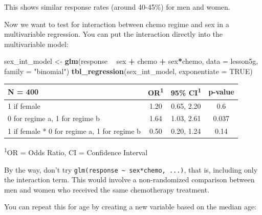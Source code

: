 \documentclass[]{book}
\newenvironment{Shaded}{\begin{snugshade}}{\end{snugshade}}
\newcommand{\CommentTok}[1]{\textcolor[rgb]{0.56,0.35,0.01}{\textit{#1}}}
\newcommand{\DataTypeTok}[1]{\textcolor[rgb]{0.13,0.29,0.53}{#1}}
\newcommand{\KeywordTok}[1]{\textcolor[rgb]{0.13,0.29,0.53}{\textbf{#1}}}
\newcommand{\NormalTok}[1]{#1}
\newcommand{\OperatorTok}[1]{\textcolor[rgb]{0.81,0.36,0.00}{\textbf{#1}}}
\newcommand{\OtherTok}[1]{\textcolor[rgb]{0.56,0.35,0.01}{#1}}
\newcommand{\StringTok}[1]{\textcolor[rgb]{0.31,0.60,0.02}{#1}}
\begin{document}
This shows similar response rates (around 40-45\%) for men and women.

Now we want to test for interaction between chemo regime and sex in a multivariable regression. You can put the interaction directly into the multivariable model:

\begin{Shaded}
\begin{Highlighting}[]
\NormalTok{sex_int_model <-}\StringTok{ }\KeywordTok{glm}\NormalTok{(response }\OperatorTok{~}\StringTok{ }\NormalTok{sex }\OperatorTok{+}\StringTok{ }\NormalTok{chemo }\OperatorTok{+}\StringTok{ }\NormalTok{sex}\OperatorTok{*}\NormalTok{chemo,}
                     \DataTypeTok{data =}\NormalTok{ lesson5g,}
                     \DataTypeTok{family =} \StringTok{"binomial"}\NormalTok{)}
\KeywordTok{tbl_regression}\NormalTok{(sex_int_model, }\DataTypeTok{exponentiate =} \OtherTok{TRUE}\NormalTok{)}
\end{Highlighting}
\end{Shaded}

\captionsetup[table]{labelformat=empty,skip=1pt}
\begin{longtable}{lccc}
\toprule
\textbf{N = 400} & \textbf{OR}\textsuperscript{1} & \textbf{95\% CI}\textsuperscript{1} & \textbf{p-value} \\ 
\midrule
1 if female & 1.20 & 0.65, 2.20 & 0.6 \\ 
0 for regime a, 1 for regime b & 1.64 & 1.03, 2.61 & 0.037 \\ 
1 if female * 0 for regime a, 1 for regime b & 0.50 & 0.20, 1.24 & 0.14 \\ 
\bottomrule
\end{longtable}
\vspace{-5mm}
\begin{minipage}{\linewidth}
\textsuperscript{1}OR = Odds Ratio, CI = Confidence Interval \\ 
\end{minipage}

By the way, don't try \texttt{glm(response\ \textasciitilde{}\ sex*chemo,\ ...)}, that is, including only the interaction term. This would involve a non-randomized comparison between men and women who received the same chemotherapy treatment.

You can repeat this for age by creating a new variable based on the median age:

\begin{Shaded}
\end{Shaded}
\end{document}
